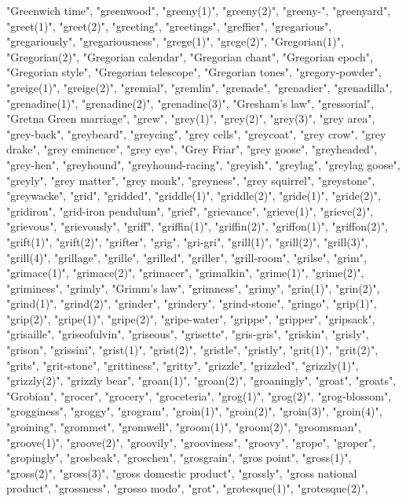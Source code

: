 "Greenwich time",
"greenwood",
"greeny(1)",
"greeny(2)",
"greeny-",
"greenyard",
"greet(1)",
"greet(2)",
"greeting",
"greetings",
"greffier",
"gregarious",
"gregariously",
"gregariousness",
"grege(1)",
"grege(2)",
"Gregorian(1)",
"Gregorian(2)",
"Gregorian calendar",
"Gregorian chant",
"Gregorian epoch",
"Gregorian style",
"Gregorian telescope",
"Gregorian tones",
"gregory-powder",
"greige(1)",
"greige(2)",
"gremial",
"gremlin",
"grenade",
"grenadier",
"grenadilla",
"grenadine(1)",
"grenadine(2)",
"grenadine(3)",
"Gresham's law",
"gressorial",
"Gretna Green marriage",
"grew",
"grey(1)",
"grey(2)",
"grey(3)",
"grey area",
"grey-back",
"greybeard",
"greycing",
"grey cells",
"greycoat",
"grey crow",
"grey drake",
"grey eminence",
"grey eye",
"Grey Friar",
"grey goose",
"greyheaded",
"grey-hen",
"greyhound",
"greyhound-racing",
"greyish",
"greylag",
"greylag goose",
"greyly",
"grey matter",
"grey monk",
"greyness",
"grey squirrel",
"greystone",
"greywacke",
"grid",
"gridded",
"griddle(1)",
"griddle(2)",
"gride(1)",
"gride(2)",
"gridiron",
"grid-iron pendulum",
"grief",
"grievance",
"grieve(1)",
"grieve(2)",
"grievous",
"grievously",
"griff",
"griffin(1)",
"griffin(2)",
"griffon(1)",
"griffon(2)",
"grift(1)",
"grift(2)",
"grifter",
"grig",
"gri-gri",
"grill(1)",
"grill(2)",
"grill(3)",
"grill(4)",
"grillage",
"grille",
"grilled",
"griller",
"grill-room",
"grilse",
"grim",
"grimace(1)",
"grimace(2)",
"grimacer",
"grimalkin",
"grime(1)",
"grime(2)",
"griminess",
"grimly",
"Grimm's law",
"grimness",
"grimy",
"grin(1)",
"grin(2)",
"grind(1)",
"grind(2)",
"grinder",
"grindery",
"grind-stone",
"gringo",
"grip(1)",
"grip(2)",
"gripe(1)",
"gripe(2)",
"gripe-water",
"grippe",
"gripper",
"gripsack",
"grisaille",
"griseofulvin",
"griseous",
"grisette",
"gris-gris",
"griskin",
"grisly",
"grison",
"grissini",
"grist(1)",
"grist(2)",
"gristle",
"gristly",
"grit(1)",
"grit(2)",
"grits",
"grit-stone",
"grittiness",
"gritty",
"grizzle",
"grizzled",
"grizzly(1)",
"grizzly(2)",
"grizzly bear",
"groan(1)",
"groan(2)",
"groaningly",
"groat",
"groats",
"Grobian",
"grocer",
"grocery",
"groceteria",
"grog(1)",
"grog(2)",
"grog-blossom",
"grogginess",
"groggy",
"grogram",
"groin(1)",
"groin(2)",
"groin(3)",
"groin(4)",
"groining",
"grommet",
"gromwell",
"groom(1)",
"groom(2)",
"groomsman",
"groove(1)",
"groove(2)",
"groovily",
"grooviness",
"groovy",
"grope",
"groper",
"gropingly",
"grosbeak",
"groschen",
"grosgrain",
"gros point",
"gross(1)",
"gross(2)",
"gross(3)",
"gross domestic product",
"grossly",
"gross national product",
"grossness",
"grosso modo",
"grot",
"grotesque(1)",
"grotesque(2)",
